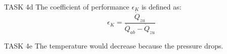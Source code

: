 TASK 4d  
The coefficient of performance \( \epsilon_K \) is defined as:  
\[
\epsilon_K = \frac{\dot{Q}_{zu}}{\dot{Q}_{ab} - \dot{Q}_{zu}}
\]

TASK 4e  
The temperature would decrease because the pressure drops.